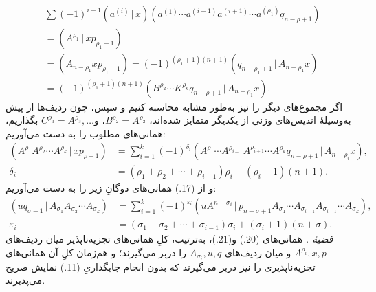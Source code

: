 \documentclass[11pt]{article}
\newcommand{\srcLTR}[1]{\relax\ifmmode\text{\mbox{\babelsublr{\foreignlanguage{english}{#1}}}}\else\babelsublr{\foreignlanguage{english}{#1}}\fi}
\providecommand{\pair}[2]{(#1\,|\,#2)}
\providecommand{\eps}{\varepsilon}
\begin{document}
\begin{align*}
&\sum(-1)^{i+1}\pair{a^{(i)}}{x}(a^{(1)}\cdots a^{(i-1)}a^{(i+1)}\cdots a^{(\rho_1)}q_{n-\rho+1})\\
&=\pair{A^{\rho_1}}{xp_{\rho_1-1}}\\
&=(A_{n-\rho_1}xp_{\rho_1-1})=(-1)^{(\rho_1+1)(n+1)}\pair{q_{n-\rho_1+1}}{A_{n-\rho_1}x}\\
&=(-1)^{(\rho_1+1)(n+1)}\pair{B^{\rho_2}\cdots K^{\rho_k}q_{n-\rho+1}}{A_{n-\rho_1}x}.
\end{align*}
اگر مجموع‌های دیگر را نیز به‌طور مشابه محاسبه کنیم و سپس، چون ردیف‌ها از پیش به‌وسیلهٔ اندیس‌های وزنی از یکدیگر متمایز شده‌اند، $B^{\rho_2}=A^{\rho_2}$، و$C^{\rho_3}=A^{\rho_3},\ldots$ بگذاریم، همانی‌های مطلوب را به دست می‌آوریم:
\begin{equation}
\begin{aligned}
\pair{A^{\rho_1}A^{\rho_2}\cdots A^{\rho_k}}{xp_{\rho-1}}
&=\sum_{i=1}^{k}(-1)^{\delta_i}\pair{A^{\rho_1}\cdots A^{\rho_{i-1}}A^{\rho_{i+1}}\cdots A^{\rho_k}q_{n-\rho+1}}{A_{n-\rho_i}x},\\
\delta_i&=(\rho_1+\rho_2+\cdots+\rho_{i-1})\rho_i+(\rho_i+1)(n+1).
\end{aligned}
\tag{20}
\end{equation}
و از (17.) همانی‌های دوگانِ زیر را به دست می‌آوریم:
\begin{equation}
\begin{aligned}
\pair{u q_{\sigma-1}}{A_{\sigma_1}A_{\sigma_2}\cdots A_{\sigma_k}}
&=\sum_{i=1}^{k}(-1)^{\eps_i}\pair{u A^{n-\sigma_i}}{p_{n-\sigma+1}A_{\sigma_1}\cdots A_{\sigma_{i-1}}A_{\sigma_{i+1}}\cdots A_{\sigma_k}},\\
\eps_i&=(\sigma_1+\sigma_2+\cdots+\sigma_{i-1})\sigma_i+(\sigma_i+1)(n+\sigma).
\end{aligned}
\tag{21}
\end{equation}
\emph{قضیهٔ \srcLTR{II}.} همانی‌های (20.) و(21.)، به‌ترتیب، کلِ همانی‌های تجزیه‌ناپذیر میان ردیف‌های $A^{\rho_i},x,p$ و میان ردیف‌های $A_{\sigma_i},u,q$ را دربر می‌گیرند؛ و هم‌زمان کلِ آن همانی‌های تجزیه‌ناپذیری را نیز دربر می‌گیرند که بدون انجام جایگذاریِ (11.) نمایش صریح می‌پذیرند.
\end{document}
